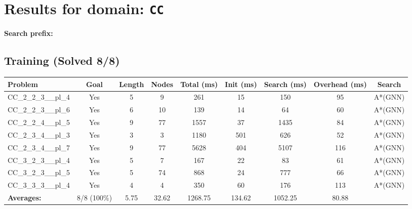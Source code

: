 \documentclass{article}
\begin{document}
\section*{Results for domain: \texttt{CC}}
\textbf{Search prefix:} 
\\[0.5cm]
\subsection*{Training (Solved 8/8)}
\begin{tabular}{lcccccccc}
\toprule
Problem & Goal & Length & Nodes & Total (ms) & Init (ms) & Search (ms) & Overhead (ms) & Search \\
\midrule
CC\_2\_2\_3\_\_pl\_4 & Yes & 5 & 9 & 261 & 15 & 150 & 95 & A*(GNN) \\
CC\_2\_2\_3\_\_pl\_6 & Yes & 6 & 10 & 139 & 14 & 64 & 60 & A*(GNN) \\
CC\_2\_2\_4\_\_pl\_5 & Yes & 9 & 77 & 1557 & 37 & 1435 & 84 & A*(GNN) \\
CC\_2\_3\_4\_\_pl\_3 & Yes & 3 & 3 & 1180 & 501 & 626 & 52 & A*(GNN) \\
CC\_2\_3\_4\_\_pl\_7 & Yes & 9 & 77 & 5628 & 404 & 5107 & 116 & A*(GNN) \\
CC\_3\_2\_3\_\_pl\_4 & Yes & 5 & 7 & 167 & 22 & 83 & 61 & A*(GNN) \\
CC\_3\_2\_3\_\_pl\_5 & Yes & 5 & 74 & 868 & 24 & 777 & 66 & A*(GNN) \\
CC\_3\_3\_3\_\_pl\_4 & Yes & 4 & 4 & 350 & 60 & 176 & 113 & A*(GNN) \\
\textbf{Averages:} & 8/8 (100\%) & 5.75 & 32.62 & 1268.75 & 134.62 & 1052.25 & 80.88 & \\
\bottomrule
\end{tabular}
\\[0.7cm]
\end{document}

